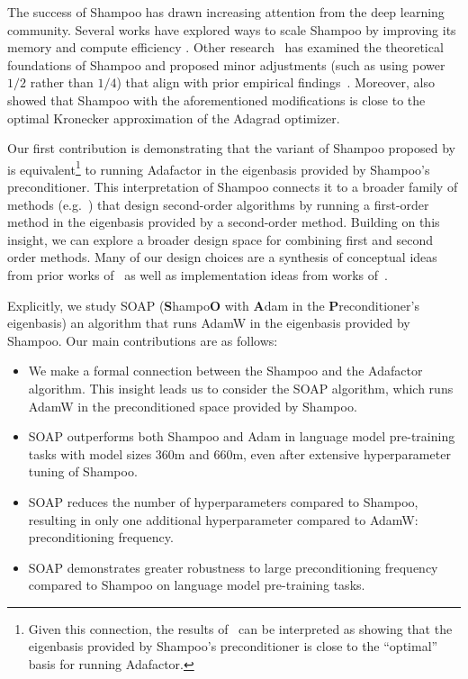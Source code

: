 \documentclass{article} %
\begin{document}
The success of Shampoo has drawn increasing attention from the deep learning community. Several works have explored ways to scale Shampoo by improving its memory and compute efficiency \citep{4bitshampoo, anil2020scalable, distributedshampoo}. Other research~\citep{whyshampoo} has examined the theoretical foundations of Shampoo and proposed minor adjustments (such as using power $1/2$ rather than $1/4$) that align with prior empirical findings~\citep{anil2020scalable}. Moreover, \citet{whyshampoo} also showed that Shampoo with the aforementioned modifications is close to the optimal Kronecker approximation of the Adagrad \citep{adagrad} optimizer.

Our first contribution is demonstrating that the variant of Shampoo proposed by \citet{whyshampoo} is equivalent\footnote{Given this connection, the results of~\citet{whyshampoo} can be interpreted as showing that the eigenbasis provided by Shampoo's preconditioner is close to the ``optimal'' basis for running Adafactor.} to running Adafactor \citep{adafactor, zhai} in the eigenbasis provided by Shampoo's preconditioner. This interpretation of Shampoo connects it to a broader family of methods (e.g.~\citep{ekfac}) that design second-order algorithms by running a first-order method in the eigenbasis provided by a second-order method. Building on this insight, we can explore a broader design space for combining first and second order methods. Many of our design choices are a synthesis of conceptual ideas from prior works of~\citet{ekfac,anil2020scalable,whyshampoo} as well as implementation ideas from works of~\citet{4bitshampoo,galore}.


Explicitly, we study SOAP (\textbf{S}hampo\textbf{O} with \textbf{A}dam in the \textbf{P}reconditioner's eigenbasis) an algorithm that runs AdamW in the eigenbasis provided by Shampoo.  Our main contributions are as follows:

\begin{itemize} 
\item We make a formal connection between the Shampoo and the Adafactor algorithm. This insight leads us to consider the SOAP algorithm, which runs AdamW in the preconditioned space provided by Shampoo. 
\item SOAP outperforms both Shampoo and Adam in language model pre-training tasks with model sizes 360m and 660m, even after extensive hyperparameter tuning of Shampoo. 
\item SOAP reduces the number of hyperparameters compared to Shampoo, resulting in only one additional hyperparameter compared to AdamW: preconditioning frequency. 
\item SOAP demonstrates greater robustness to large preconditioning frequency compared to Shampoo on language model pre-training tasks.
\end{itemize}
\end{document}
